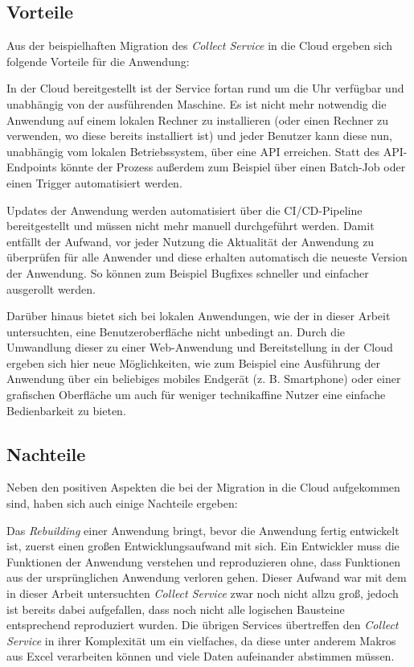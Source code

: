 \subsection{Vorteile}
Aus der beispielhaften Migration des \textit{Collect Service} in die Cloud ergeben sich folgende Vorteile für die Anwendung:

In der Cloud bereitgestellt ist der Service fortan rund um die Uhr verfügbar und unabhängig von der ausführenden Maschine. Es ist nicht mehr notwendig die Anwendung auf einem lokalen Rechner zu installieren (oder einen Rechner zu verwenden, wo diese bereits installiert ist) und jeder Benutzer kann diese nun, unabhängig vom lokalen Betriebssystem, über eine \ac{API} erreichen. Statt des \ac{API}-Endpoints könnte der Prozess außerdem zum Beispiel über einen Batch-Job oder einen Trigger automatisiert werden.

Updates der Anwendung werden automatisiert über die \ac{CI/CD}-Pipeline bereitgestellt und müssen nicht mehr manuell durchgeführt werden. Damit entfällt der Aufwand, vor jeder Nutzung die Aktualität der Anwendung zu überprüfen für alle Anwender und diese erhalten automatisch die neueste Version der Anwendung. So können zum Beispiel Bugfixes schneller und einfacher ausgerollt werden. 

Darüber hinaus bietet sich bei lokalen Anwendungen, wie der in dieser Arbeit untersuchten, eine Benutzeroberfläche nicht unbedingt an. Durch die Umwandlung dieser zu einer Web-Anwendung und Bereitstellung in der Cloud ergeben sich hier neue Möglichkeiten, wie zum Beispiel eine Ausführung der Anwendung über ein beliebiges mobiles Endgerät (z. B. Smartphone) oder einer grafischen Oberfläche um auch für weniger technikaffine Nutzer eine einfache Bedienbarkeit zu bieten. \pagebreak

\subsection{Nachteile}
Neben den positiven Aspekten die bei der Migration in die Cloud aufgekommen sind, haben sich auch einige Nachteile ergeben:

Das \textit{Rebuilding} einer Anwendung bringt, bevor die Anwendung fertig entwickelt ist, zuerst einen großen Entwicklungsaufwand mit sich. Ein Entwickler muss die Funktionen der Anwendung verstehen und reproduzieren ohne, dass Funktionen aus der ursprünglichen Anwendung verloren gehen. Dieser Aufwand war mit dem in dieser Arbeit untersuchten \textit{Collect Service} zwar noch nicht allzu groß, jedoch ist bereits dabei aufgefallen, dass noch nicht alle logischen Bausteine entsprechend reproduziert wurden. Die übrigen Services übertreffen den \textit{Collect Service} in ihrer Komplexität um ein vielfaches, da diese unter anderem Makros aus Excel verarbeiten können und viele Daten aufeinander abstimmen müssen.

